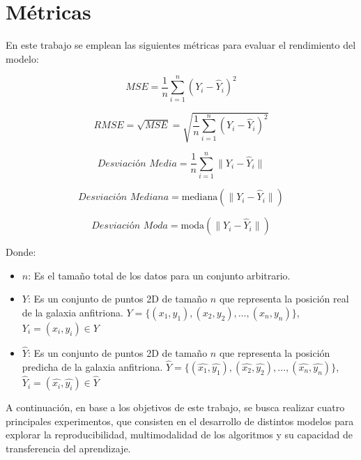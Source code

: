 \documentclass[../tesis.tex]{subfiles}
\begin{document}
\section{Métricas}\label{methods:metrics}

En este trabajo se emplean las siguientes métricas para evaluar el rendimiento del modelo:

\begin{equation}\label{eq:mse}
MSE = \frac{1}{n} \sum_{i=1}^{n} (Y_i - \hat{Y}_i)^2
\end{equation}

\begin{equation}\label{eq:rmse}
RMSE = \sqrt{MSE} = \sqrt{\frac{1}{n} \sum_{i=1}^{n} (Y_i - \hat{Y}_i)^2}
\end{equation}

\begin{equation}\label{eq:mean_deviation}
\textit{Desviación Media} = \frac{1}{n} \sum_{i=1}^{n} \| Y_i - \hat{Y}_i \|
\end{equation}

\begin{equation}\label{eq:median_deviation}
\textit{Desviación Mediana} = \text{mediana}(\| Y_i - \hat{Y}_i \|)
\end{equation}

\begin{equation}\label{eq:mode_deviation}
\textit{Desviación Moda} = \text{moda}(\| Y_i - \hat{Y}_i \|)
\end{equation}

Donde:
\begin{itemize}
    \item $n$: Es el tamaño total de los datos para un conjunto arbitrario.
    \item $Y$: Es un conjunto de puntos 2D de tamaño $n$ que representa la posición real de la galaxia anfitriona. $Y = \{(x_1, y_1), (x_2, y_2), \ldots, (x_n, y_n)\}$, $Y_i = (x_i, y_i) \in Y$
    \item $\hat{Y}$: Es un conjunto de puntos 2D de tamaño $n$ que representa la posición predicha de la galaxia anfitriona. $\hat{Y} = \{(\hat{x_1}, \hat{y_1}), (\hat{x_2}, \hat{y_2}), \ldots, (\hat{x_n}, \hat{y_n})\}$, $\hat{Y}_i = (\hat{x_i}, \hat{y_i}) \in \hat{Y}$
\end{itemize}

A continuación, en base a los objetivos de este trabajo, se busca realizar cuatro principales experimentos, que consisten en el desarrollo de distintos modelos para explorar la reproducibilidad, multimodalidad de los algoritmos y su capacidad de transferencia del aprendizaje.\par\null\par
\end{document}
